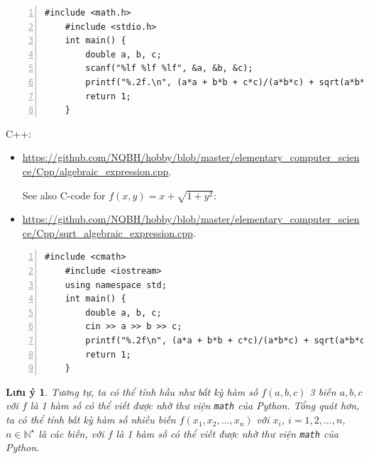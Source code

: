 \documentclass{article}
\newtheorem{luuy}{Lưu ý}
\begin{document}
\begin{Verbatim}[numbers=left,xleftmargin=5mm]
	#include <math.h>
	#include <stdio.h>
	int main() {
		double a, b, c;
		scanf("%lf %lf %lf", &a, &b, &c);
		printf("%.2f.\n", (a*a + b*b + c*c)/(a*b*c) + sqrt(a*b*c));
		return 1;
	}
\end{Verbatim}
C++:
\begin{itemize}
	\item \url{https://github.com/NQBH/hobby/blob/master/elementary_computer_science/Cpp/algebraic_expression.cpp}.
	
	See also C-code for $f(x,y) = x + \sqrt{1 + y^2}$:
	\item \url{https://github.com/NQBH/hobby/blob/master/elementary_computer_science/Cpp/sqrt_algebraic_expression.cpp}.
\end{itemize}
\begin{Verbatim}[numbers=left,xleftmargin=5mm]
	#include <cmath>
	#include <iostream>
	using namespace std;
	int main() {
		double a, b, c;
		cin >> a >> b >> c;
		printf("%.2f\n", (a*a + b*b + c*c)/(a*b*c) + sqrt(a*b*c));
		return 1;
	}
\end{Verbatim}

\begin{luuy}
	Tương tự, ta có thể tính hầu như bất kỳ hàm số $f(a,b,c)$ 3 biến $a,b,c$ với $f$ là 1 hàm số có thể viết được nhờ thư viện {\tt math} của Python. Tổng quát hơn, ta có thể tính bất kỳ hàm số nhiều biến $f(x_1,x_2,\ldots,x_n)$ với $x_i$, $i = 1,2,\ldots,n$, $n\in\mathbb{N}^\star$ là các biến, với $f$ là 1 hàm số có thể viết được nhờ thư viện {\tt math} của Python.
\end{luuy}
\end{document}
